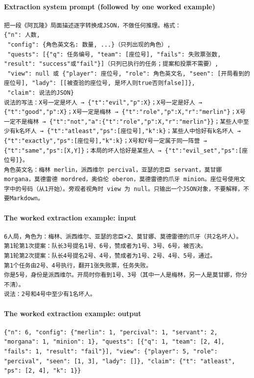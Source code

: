 \paragraph{Extraction system prompt (followed by one worked example)}
\begin{Verbatim}[breaklines,breakanywhere,fontsize=\scriptsize,frame=single,rulecolor=\color{black!25},framesep=4pt]
把一段《阿瓦隆》局面描述逐字转换成JSON，不做任何推理。格式：
{"n": 人数,
 "config": {角色英文名: 数量, ...}（只列出现的角色）,
 "quests": [{"q": 任务编号, "team": [座位号], "fails": 失败票张数, "result": "success"或"fail"}]（只列已执行的任务；提案和投票不需要）,
 "view": null 或 {"player": 座位号, "role": 角色英文名, "seen": [开局看到的座位号], "lady": [[被查验的座位号, 是坏人则true否则false]]},
 "claim": 说法的JSON}
说法的写法：X号一定是坏人 → {"t":"evil","p":X}；X号一定是好人 → {"t":"good","p":X}；X号一定是梅林 → {"t":"role","p":X,"r":"merlin"}；X号一定不是梅林 → {"t":"not","a":{"t":"role","p":X,"r":"merlin"}}；某些人中至少有k名坏人 → {"t":"atleast","ps":[座位号],"k":k}；某些人中恰好有k名坏人 → {"t":"exactly","ps":[座位号],"k":k}；X号和Y号一定属于同一阵营 → {"t":"same","ps":[X,Y]}；本局的坏人恰好是某些人 → {"t":"evil_set","ps":[座位号]}。
角色英文名：梅林 merlin，派西维尔 percival，亚瑟的忠臣 servant，莫甘娜 morgana，莫德雷德 mordred，奥伯伦 oberon，莫德雷德的爪牙 minion。座位号使用文字中的号码（从1开始）。旁观者视角时 view 为 null。只输出一个JSON对象，不要解释，不要Markdown。
\end{Verbatim}

\paragraph{The worked extraction example: input}
\begin{Verbatim}[breaklines,breakanywhere,fontsize=\scriptsize,frame=single,rulecolor=\color{black!25},framesep=4pt]
6人局，角色为：梅林、派西维尔、亚瑟的忠臣×2、莫甘娜、莫德雷德的爪牙（共2名坏人）。
第1轮第1次提案：队长3号提名1号、6号，赞成者为1号、3号、6号，被否决。
第1轮第2次提案：队长4号提名2号、4号，赞成者为1号、2号、4号、5号，通过。
第1个任务由2号、4号执行，翻开1张失败票，任务失败。
你是5号，身份是派西维尔。开局时你看到1号、3号（其中一人是梅林，另一人是莫甘娜，你分不清）。
说法：2号和4号中至少有1名坏人。
\end{Verbatim}

\paragraph{The worked extraction example: output}
\begin{Verbatim}[breaklines,breakanywhere,fontsize=\scriptsize,frame=single,rulecolor=\color{black!25},framesep=4pt]
{"n": 6, "config": {"merlin": 1, "percival": 1, "servant": 2, "morgana": 1, "minion": 1}, "quests": [{"q": 1, "team": [2, 4], "fails": 1, "result": "fail"}], "view": {"player": 5, "role": "percival", "seen": [1, 3], "lady": []}, "claim": {"t": "atleast", "ps": [2, 4], "k": 1}}
\end{Verbatim}

